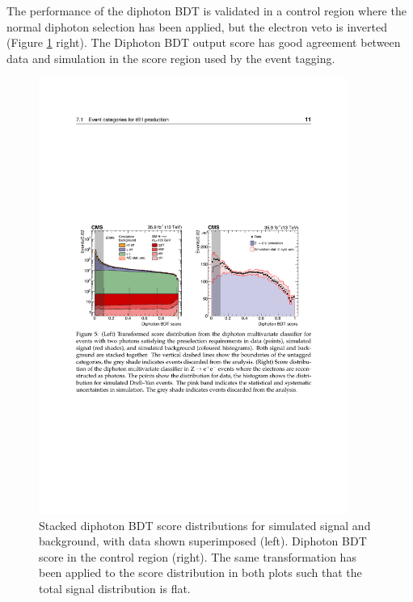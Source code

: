 The performance of the diphoton BDT is validated in a \Zee control region where the normal diphoton selection has been applied, but the electron veto is inverted (Figure \ref{fig:event_categorisaton:diphoton_bdt} right). The Diphoton BDT output score has good agreement between data and simulation in the score region used by the event tagging.
\begin{figure}[h!]
    \begin{center}
        \includegraphics[width=0.9\textwidth]{figures/event_selection/diphoton_BDT.pdf}
    \end{center}
    \caption{Stacked diphoton BDT score distributions for simulated signal and background, with data shown superimposed (left). Diphoton BDT score in the \Zee control region (right). 
             The same transformation has been applied to the score distribution in both plots such that the total signal distribution is flat.}
        \label{fig:event_categorisaton:diphoton_bdt}
\end{figure}



